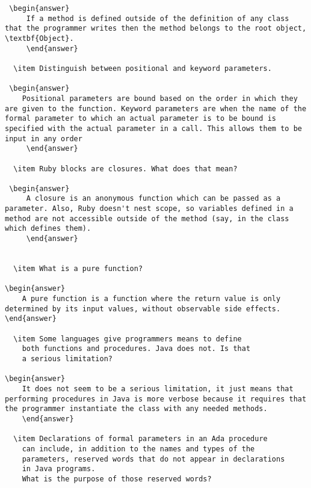 \begin{enumerate}
\begin{answer}
\begin{lstlisting}
 \begin{answer}
     If a method is defined outside of the definition of any class that the programmer writes then the method belongs to the root object, \textbf{Object}.
     \end{answer}

  \item Distinguish between positional and keyword parameters.

 \begin{answer}
    Positional parameters are bound based on the order in which they are given to the function. Keyword parameters are when the name of the formal parameter to which an actual parameter is to be bound is specified with the actual parameter in a call. This allows them to be input in any order
     \end{answer}

  \item Ruby blocks are closures. What does that mean?

 \begin{answer}
     A closure is an anonymous function which can be passed as a parameter. Also, Ruby doesn't nest scope, so variables defined in a method are not accessible outside of the method (say, in the class which defines them).
     \end{answer}
   

  \item What is a pure function?

\begin{answer}
    A pure function is a function where the return value is only determined by its input values, without observable side effects.
\end{answer}

  \item Some languages give programmers means to define
    both functions and procedures. Java does not. Is that
    a serious limitation?

\begin{answer}
    It does not seem to be a serious limitation, it just means that performing procedures in Java is more verbose because it requires that the programmer instantiate the class with any needed methods.
    \end{answer}

  \item Declarations of formal parameters in an Ada procedure
    can include, in addition to the names and types of the
    parameters, reserved words that do not appear in declarations
    in Java programs. 
    What is the purpose of those reserved words?
 

\end{lstlisting}
\end{answer}
\end{enumerate}
